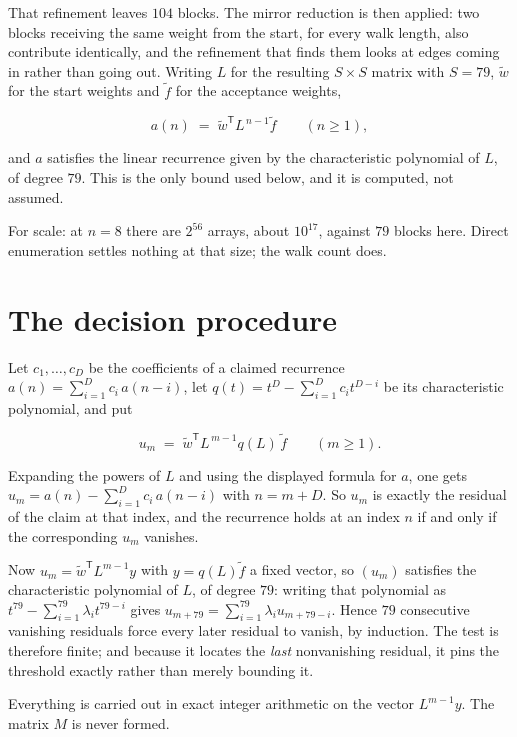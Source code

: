\documentclass[11pt]{article}
\theoremstyle{definition}
\begin{document}
That refinement leaves $104$ blocks. The mirror reduction is then applied: two blocks receiving the same weight from the start, for every walk length, also contribute identically, and the refinement that finds them looks at edges coming in rather than going out. Writing $L$ for the resulting $S \times S$ matrix with $S = 79$, $\tilde w$ for the start weights and $\tilde f$ for the acceptance weights,

\[a(n) \;=\; \tilde w^{\mathsf T} L^{\,n-1} \tilde f \qquad (n \ge 1),\]

and $a$ satisfies the linear recurrence given by the characteristic polynomial of $L$, of degree $79$. This is the only bound used below, and it is computed, not assumed.

For scale: at $n = 8$ there are $2^{56}$ arrays, about $10^{17}$, against $79$ blocks here. Direct enumeration settles nothing at that size; the walk count does.

\section{The decision procedure}

Let $c_1,\dots,c_D$ be the coefficients of a claimed recurrence $a(n) = \sum_{i=1}^{D} c_i\,a(n-i)$, let $q(t) = t^{D} - \sum_{i=1}^{D} c_i t^{D-i}$ be its characteristic polynomial, and put

\[u_m \;=\; \tilde w^{\mathsf T} L^{\,m-1} q(L)\,\tilde f \qquad (m \ge 1).\]

Expanding the powers of $L$ and using the displayed formula for $a$, one gets $u_m = a(n) - \sum_{i=1}^{D} c_i\,a(n-i)$ with $n = m + D$. So $u_m$ is exactly the residual of the claim at that index, and the recurrence holds at an index $n$ if and only if the corresponding $u_m$ vanishes.

Now $u_m = \tilde w^{\mathsf T} L^{m-1} y$ with $y = q(L)\tilde f$ a fixed vector, so $(u_m)$ satisfies the characteristic polynomial of $L$, of degree $79$: writing that polynomial as $t^{79} - \sum_{i=1}^{79} \lambda_i t^{79-i}$ gives $u_{m+79} = \sum_{i=1}^{79} \lambda_i u_{m+79-i}$. Hence $79$ consecutive vanishing residuals force every later residual to vanish, by induction. The test is therefore finite; and because it locates the {\itshape last} nonvanishing residual, it pins the threshold exactly rather than merely bounding it.

Everything is carried out in exact integer arithmetic on the vector $L^{m-1}y$. The matrix $M$ is never formed.
\end{document}
